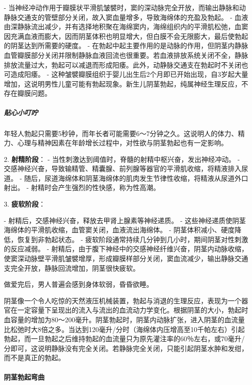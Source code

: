\begin{enumerate}
   - 当神经冲动作用于瓣膜状平滑肌皱襞时，窦的深动脉完全开放，而输出静脉和动静脉交通支的管壁部分关闭，故入窦血量增多，导致海绵体的充盈及勃起。
   - 血液由深静脉流出减少，并有选择地积聚在海绵窦内，海绵组织内的平滑肌松弛，血窦因充满血液而膨大，因而阴茎体积也明显增大，但白膜不会无限膨大，最后使勃起的阴茎达到所需要的硬度。
   - 在勃起中起主要作用的是动脉的作用，但阴茎内静脉血管瓣膜部分关闭并限制静脉血液回流也很重要。若血液排放系统关闭不全，静脉排放流量过大，勃起可以减退而形成阳痿。此外，动静脉交通支在勃起时不关闭也可造成阳痿。
   - 这种皱襞瓣膜组织于婴儿出生后2个月即已开始出现，自3岁起大量增加，这说明男性儿童可能有勃起现象。新生儿阴茎勃起，纯属神经生理反应，不存在瓣膜问题。

\subparagraph{贴心小叮咛}

年轻人勃起只需要5秒钟，而年长者可能需要6～7分钟之久。这说明人的体力、精力、心理与精神因素在年龄增长过程中，对性欲与阴茎勃起也有一定影响。

2. \textbf{射精阶段}：
   - 当性刺激达到阈值时，脊髓的射精中枢兴奋，发出神经冲动。
   - 交感神经兴奋，导致输精管、精囊腺、前列腺等器官的平滑肌收缩，将精液排入尿道。
   - 随后，尿道海绵体和阴茎海绵体的肌肉发生节律性收缩，将精液从尿道外口射出。
   - 射精时会产生强烈的性快感，称为性高潮。

3. \textbf{疲软阶段}：
   
   - 射精后，交感神经兴奋，释放去甲肾上腺素等神经递质。
   - 这些神经递质使阴茎海绵体的平滑肌收缩，血管窦关闭，血液流出海绵体。
   - 阴茎体积减小、硬度降低，恢复到非勃起状态。
   - 疲软阶段通常持续几分钟到几小时，期间阴茎对性刺激的反应减弱。
   - 射精后，由于腹下神经中的交感神经纤维兴奋，阴茎内动脉收缩，使窦深动脉壁平滑肌皱襞增厚，形成瓣膜样部分关闭，窦血流减少，输出静脉交通支完全开放，静脉回流增加，阴茎很快疲软。

做爱完后，男人普遍会感到身体软弱，昏昏欲睡。

阴茎像一个令人吃惊的天然液压机械装置，勃起与消退的生理反应，表现为一个器官在一定容量下呈现出的流入与流出的血流动力学变化。根据阴茎的大小，勃起时血容量的增加为80～200毫升。阴茎勃起时，阴茎内动脉扩张，进入阴茎的血流量比松弛时大8倍之多。当达到120毫升/分时（海绵体内压增高至10千帕左右）引起勃起，而一旦勃起之后维持勃起的血流量只为原先灌注率的60％左右，或70毫升/分即可，这说明静脉没有完全关闭。若静脉完全关闭，只能引起阴茎水肿和发绀，而不是真正的勃起。

\paragraph{阴茎勃起弯曲}


\end{enumerate}
